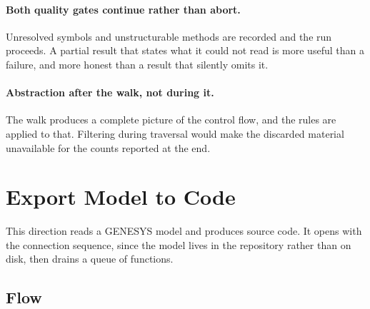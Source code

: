 \paragraph{Both quality gates continue rather than abort.}
Unresolved symbols and unstructurable methods are recorded and the run proceeds.
A partial result that states what it could not read is more useful than a failure,
and more honest than a result that silently omits it.

\paragraph{Abstraction after the walk, not during it.}
The walk produces a complete picture of the control flow, and the rules are
applied to that. Filtering during traversal would make the discarded material
unavailable for the counts reported at the end.

\section{Export Model to Code}
\label{sec:export-activity}

This direction reads a GENESYS model and produces source code. It opens with the
connection sequence, since the model lives in the repository rather than on
disk, then drains a queue of functions.


\subsection{Flow}

